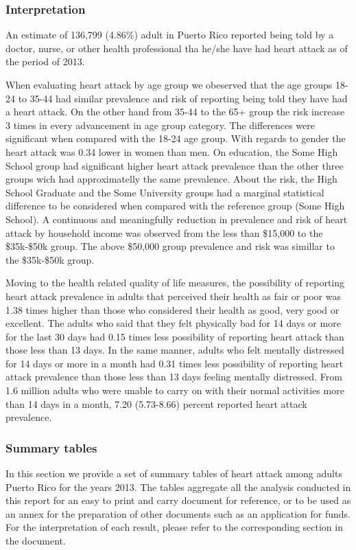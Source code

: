 \newpage
 \subsubsection{Interpretation}

An estimate of 136,799 
(4.86\%) adult in Puerto Rico reported being told by a doctor, nurse, or other health professional tha he/she have had heart attack as of the period of 2013.

When evaluating heart attack by age group we obeserved that the age groups 18-24 to 35-44 had similar prevalence and risk of reporting being told they have had a heart attack. On the other hand from 35-44 to the 65+ group the risk increase 3 times in every advancement in age group category. The differences were significant when compared with the 18-24 age group. With regards to gender the heart attack was 0.34 lower in women than men. On education, the Some High School group had significant higher heart attack prevalence than the other three groups wich had approximatelly the same prevalence.  About the risk, the High School Graduate and the Some University groups had a marginal statistical difference to be considered when compared with the reference group (Some High School). A continuous and meaningfully reduction in prevalence and risk of heart attack by household income was observed from the less than \$15,000 to the \$35k-\$50k group.  The above \$50,000 group prevalence and risk was simillar to the \$35k-\$50k group.

Moving to the health related quality of life measures, the possibility of reporting heart attack prevalence in adults that perceived their health as fair or poor was 1.38 times higher than those who considered their health as good, very good or excellent. The adults who said that they felt physically bad for 14 days or more for the last 30 days had 0.15 times less possibility of reporting heart attack than those less than 13 days. In the same manner, adults who felt mentally distressed for 14 days or more in a month had 0.31 times less possibility of reporting heart attack prevalence than those less than 13 days feeling mentally distressed. From 1.6 million adults who were unable to carry on with their normal activities more than 14 days in a month, 7.20 (5.73-8.66) percent reported heart attack prevalence. 



\newpage
\subsubsection{Summary tables}
In this section we provide a set of summary tables of heart attack among adults Puerto Rico for the years 2013. The tables aggregate all the analysis conducted in this report for an easy to print and carry document for reference, or to be used as an annex for the preparation of other documents such as an application for funds. For the interpretation of each result, please refer to the corresponding section in the document.


